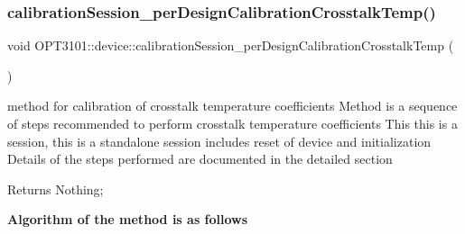 \subsubsection{\texorpdfstring{calibration\+Session\+\_\+per\+Design\+Calibration\+Crosstalk\+Temp()}{calibrationSession\_perDesignCalibrationCrosstalkTemp()}}
{\footnotesize\ttfamily void O\+P\+T3101\+::device\+::calibration\+Session\+\_\+per\+Design\+Calibration\+Crosstalk\+Temp (\begin{DoxyParamCaption}{ }\end{DoxyParamCaption})}



method for calibration of crosstalk temperature coefficients Method is a sequence of steps recommended to perform crosstalk temperature coefficients This this is a session, this is a standalone session includes reset of device and initialization Details of the steps performed are documented in the detailed section 

\begin{DoxyReturn}{Returns}
Nothing; 
\end{DoxyReturn}
{\bfseries Algorithm of the method is as follows}


